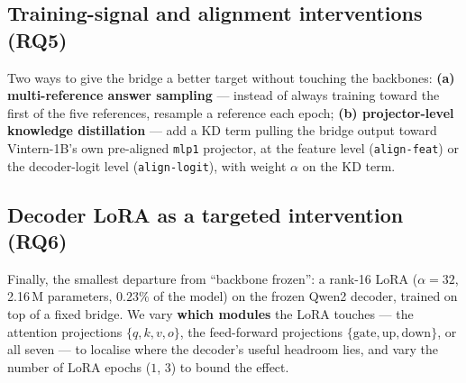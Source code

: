 \subsection{Training-signal and alignment interventions (RQ5)}
\label{sec:method-rq5}

Two ways to give the bridge a better target without touching the backbones:
\textbf{(a) multi-reference answer sampling} --- instead of always training toward
the first of the five references, resample a reference each epoch;
\textbf{(b) projector-level knowledge distillation} --- add a KD term pulling the
bridge output toward Vintern-1B's own pre-aligned \texttt{mlp1} projector, at the
feature level (\texttt{align-feat}) or the decoder-logit level
(\texttt{align-logit}), with weight $\alpha$ on the KD term.

\subsection{Decoder LoRA as a targeted intervention (RQ6)}
\label{sec:method-rq6}

Finally, the smallest departure from ``backbone frozen'': a rank-16 LoRA
($\alpha = 32$, 2.16\,M parameters, $0.23\%$ of the model) on the frozen Qwen2
decoder, trained on top of a fixed bridge. We vary \textbf{which modules} the
LoRA touches --- the attention projections $\{q,k,v,o\}$, the feed-forward
projections $\{\text{gate},\text{up},\text{down}\}$, or all seven --- to localise
where the decoder's useful headroom lies, and vary the number of LoRA epochs
($1$, $3$) to bound the effect.
